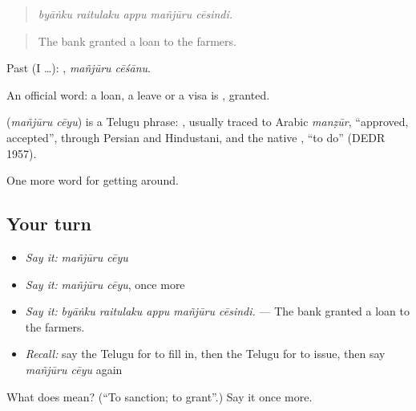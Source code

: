 \begin{quote}
\emph{byāṅku raitulaku appu mañjūru cēsindi.}
\end{quote}

\begin{quote}
The bank granted a loan to the farmers.
\end{quote}

Past (I …):  , \emph{mañjūru cēśānu}.

An official word: a loan, a leave or a visa is , granted.

\begin{cousinweb}
\textbf{ } (\emph{mañjūru cēyu}) is a Telugu phrase: , usually traced to Arabic \emph{manẓūr}, \textquotedblleft{}approved, accepted\textquotedblright{}, through Persian and Hindustani, and the native , \textquotedblleft{}to do\textquotedblright{} (DEDR 1957).
\end{cousinweb}

\begin{grammarlens}[title={What you've built}]
One more word for getting around.
\end{grammarlens}

\subsection*{Your turn}
\begin{itemize}
\raggedright
  \item \emph{Say it:} \emph{mañjūru cēyu}
  \item \emph{Say it:} \emph{mañjūru cēyu}, once more
  \item \emph{Say it:} \emph{byāṅku raitulaku appu mañjūru cēsindi.} — The bank granted a loan to the farmers.
  \item \emph{Recall:} say the Telugu for to fill in, then the Telugu for to issue, then say \emph{mañjūru cēyu} again
\end{itemize}

\begin{tcolorbox}[breakable,colback=teal!4,colframe=teal!35!black,title={Before you move on}]
What does   mean? (\textquotedblleft{}To sanction; to grant\textquotedblright{}.) Say it once more.
\end{tcolorbox}
